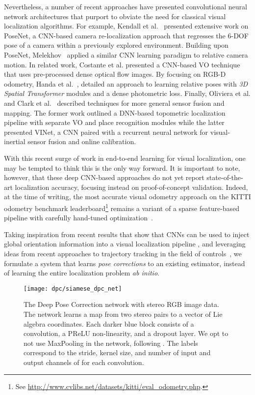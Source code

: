 Nevertheless, a number of recent approaches have presented convolutional neural network architectures that purport to obviate the need for classical visual localization algorithms. For example, Kendall et al.~\cite{Kendall2015-kh,Kendall2017-ix} presented extensive work on PoseNet, a CNN-based camera re-localization approach that regresses the 6-DOF pose of a camera within a previously explored environment. Building upon PoseNet, Melekhov~\cite{Melekhov2017-dl} applied a similar CNN learning paradigm to relative camera motion. In related work, Costante et al. \cite{Costante2016-hb} presented a CNN-based VO technique that uses pre-processed dense optical flow images. By focusing on RGB-D odometry, Handa et al.~\cite{Handa2016-hm}, detailed an approach to learning relative poses with \textit{3D Spatial Transformer} modules and a dense photometric loss. Finally, Oliviera et al. \cite{Oliveira2017-lt} and Clark et al.~\cite{Clark2017-zg} described techniques for more general sensor fusion and mapping. The former work outlined a DNN-based topometric localization pipeline with separate VO and place recognition modules while the latter presented VINet, a CNN paired with a recurrent neural network for visual-inertial sensor fusion and online calibration.

With this recent surge of work in end-to-end learning for visual localization, one may be tempted to think this is the only way forward. It is important to note, however, that these deep CNN-based approaches do not yet report state-of-the-art localization accuracy, focusing instead on proof-of-concept validation. Indeed, at the time of writing, the most accurate visual odometry approach on the KITTI odometry benchmark leaderboard\footnote{See \url{http://www.cvlibs.net/datasets/kitti/eval_odometry.php}.} remains a variant of a sparse feature-based pipeline with carefully hand-tuned optimization~\cite{Cvisic2015-mt}. 

Taking inspiration from recent results that show that CNNs can be used to inject global orientation information into a visual localization pipeline \cite{Peretroukhin2017-eb}, and leveraging ideas from recent approaches to trajectory tracking in the field of controls~\cite{2017_Li_Deep, Punjani2015-pj}, we formulate a system that learns \textit{pose corrections} to an existing estimator, instead of learning the entire localization problem \textit{ab initio}.

\begin{figure}
	\centering
	\texttt{[image: dpc/siamese\_dpc\_net]}
	\caption{The Deep Pose Correction network with stereo RGB image data. 
	The network learns a map from two stereo pairs to a vector of Lie algebra coordinates. 
	Each darker blue block consists of a convolution, a PReLU non-linearity, and a dropout layer. We opt to not use MaxPooling in the network, following \cite{Handa2016-hm}.
	The labels correspond to the stride, kernel size, and number of input and output channels of for each convolution.}
	\label{fig:dpc_net}
	\vspace{-1em}
\end{figure}

